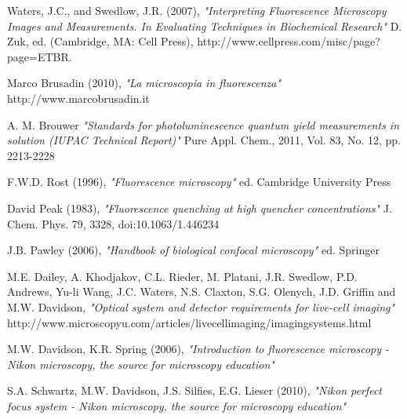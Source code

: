 \clearpage{\pagestyle{empty}\cleardoublepage}

\begin{thebibliography}{3}


 Waters, J.C., and Swedlow, J.R. (2007), \emph {"Interpreting Fluorescence Microscopy Images and Measurements. In Evaluating Techniques in Biochemical Research"} \newline D. Zuk, ed. (Cambridge, MA: Cell Press), \newline http://www.cellpress.com/misc/page?page=ETBR.

 Marco Brusadin (2010), \emph{"La microscopia in fluorescenza"} \newline  http://www.marcobrusadin.it

 A. M. Brouwer \emph{"Standards for photoluminescence quantum yield measurements in solution (IUPAC Technical Report)"} \newline Pure Appl. Chem., 2011, Vol. 83, No. 12, pp. 2213-2228

 F.W.D. Rost (1996), \emph{"Fluorescence microscopy"} \newline ed. Cambridge University Press

 David Peak (1983), \emph{"Fluorescence quenching at high quencher concentrations"} \newline J. Chem. Phys. 79, 3328, doi:10.1063/1.446234

 J.B. Pawley (2006), \emph{"Handbook of biological confocal microscopy"} \newline ed. Springer

 M.E. Dailey, A. Khodjakov, C.L. Rieder, M. Platani, J.R. Swedlow, P.D. Andrews, Yu-li Wang, J.C. Waters, N.S. Claxton, S.G. Olenych, J.D. Griffin and M.W. Davidson, \emph{"Optical system and detector requirements for live-cell imaging"} \newline http://www.microscopyu.com/articles/livecellimaging/imagingsystems.html

 M.W. Davidson, K.R. Spring (2006), \emph{"Introduction to fluorescence microscopy - Nikon microscopy, the source for microscopy education"} 

 S.A. Schwartz, M.W. Davidson, J.S. Silfies, E.G. Lieser (2010), \emph{"Nikon perfect focus system - Nikon microscopy, the source for microscopy education"} 


\end{thebibliography}
